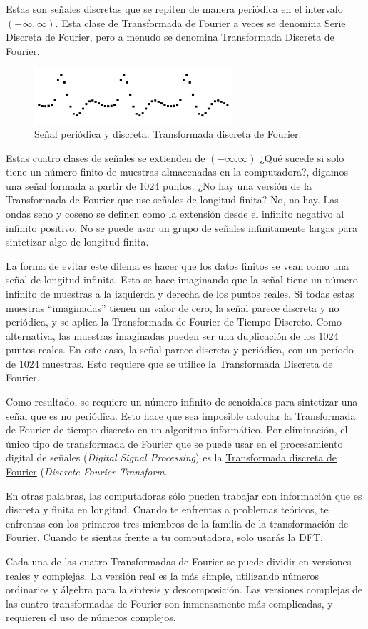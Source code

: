 \begin{enumerate}
Estas son señales discretas que se repiten de manera periódica en el intervalo $(-\infty, \infty)$. Esta clase de Transformada de Fourier a veces se denomina Serie Discreta de Fourier, pero a menudo se denomina Transformada Discreta de Fourier.
\begin{figure}[H]
    \centering
    \includegraphics{Imagenes/TDF_04.png}
    \caption{Señal periódica y discreta: Transformada discreta de Fourier.}
    \label{fig:figura_TDF_04}
\end{figure}
\end{enumerate}
Estas cuatro clases de señales se extienden de $(-\infty. \infty)$ ¿Qué sucede si solo tiene un número finito de muestras almacenadas en la computadora?, digamos una señal formada a partir de $1024$ puntos. ¿No hay una versión de la Transformada de Fourier que use señales de longitud finita? No, no hay. Las ondas seno y coseno se definen como la extensión desde el infinito negativo al infinito positivo. No se puede usar un grupo de señales infinitamente largas para sintetizar algo de longitud finita. 
\par
La forma de evitar este dilema es hacer que los datos finitos se vean como una señal de longitud infinita. Esto se hace imaginando que la señal tiene un número infinito de muestras a la izquierda y derecha de los puntos reales. Si todas estas muestras \enquote{imaginadas} tienen un valor de cero, la señal parece discreta y no periódica, y se aplica la Transformada de Fourier de Tiempo Discreto. Como alternativa, las muestras imaginadas pueden ser una duplicación de los $1024$ puntos reales. En este caso, la señal parece discreta y periódica, con un período de $1024$ muestras. Esto requiere que se utilice la Transformada Discreta de Fourier.
\par
Como resultado, se requiere un número infinito de senoidales para sintetizar una señal que es no periódica. Esto hace que sea imposible calcular la Transformada de Fourier de tiempo discreto en un algoritmo informático. Por eliminación, el único tipo de transformada de Fourier que se puede usar en el procesamiento digital de señales (\emph{Digital Signal Processing}) es la \underline{Transformada discreta de Fourier} (\emph{Discrete Fourier Transform}.
\par
En otras palabras, las computadoras sólo pueden trabajar con información que es discreta y finita en longitud. Cuando te enfrentas a problemas teóricos, te enfrentas con los primeros tres miembros de la familia de la transformación de Fourier. Cuando te sientas frente a tu computadora, solo usarás la DFT.
\par
Cada una de las cuatro Transformadas de Fourier se puede dividir en versiones reales y complejas. La versión real es la más simple, utilizando números ordinarios y álgebra para la síntesis y descomposición. Las versiones complejas de las cuatro transformadas de Fourier son inmensamente más complicadas, y requieren el uso de números complejos.
\par
